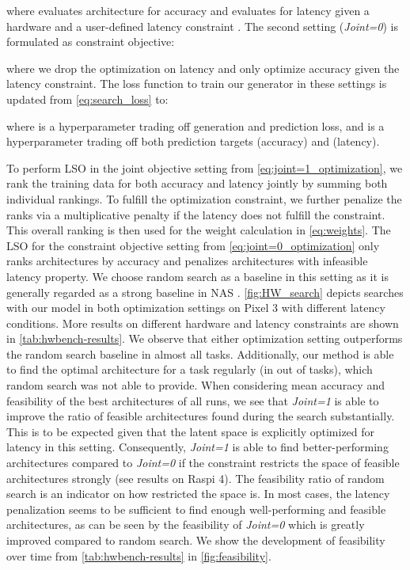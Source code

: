 \documentclass[runningheads]{llncs}
\begin{document}
where  evaluates architecture  for accuracy and  evaluates for latency given a hardware  and a user-defined latency constraint .
The second setting (\emph{Joint=0}) is formulated as constraint objective:


where we drop the optimization on latency and only optimize accuracy given the latency constraint.
The loss function to train our generator in these settings is updated from \autoref{eq:search_loss} to:

where  is a hyperparameter trading off generation and prediction loss, and  is a hyperparameter trading off both prediction targets  (accuracy) and  (latency).

To perform LSO in the joint objective setting from \autoref{eq:joint=1_optimization}, we rank the training data  for both accuracy and latency jointly by summing both individual rankings.
To fulfill the optimization constraint, we further penalize the ranks via a multiplicative penalty if the latency does not fulfill the constraint.
This overall ranking is then used for the weight calculation in \autoref{eq:weights}.
The LSO for the constraint objective setting from \autoref{eq:joint=0_optimization} only ranks architectures by accuracy and penalizes architectures with infeasible latency property.
We choose random search as a baseline in this setting as it is generally regarded as a strong baseline in NAS \cite{2019RS}.
\autoref{fig:HW_search} depicts searches with our model in both optimization settings on Pixel 3 with different latency conditions.
More results on different hardware and latency constraints are shown in \autoref{tab:hwbench-results}.
We observe that either optimization setting outperforms the random search baseline in almost all tasks.
Additionally, our method is able to find the optimal architecture for a task regularly (in  out of  tasks), which random search was not able to provide.
When considering mean accuracy and feasibility of the best architectures of all runs, we see that \emph{Joint=1} is able to improve the ratio of feasible architectures found during the search substantially.
This is to be expected given that the latent space is explicitly optimized for latency in this setting.
Consequently, \emph{Joint=1} is able to find better-performing architectures compared to \emph{Joint=0} if the constraint restricts the space of feasible architectures strongly (see results on Raspi 4).
The feasibility ratio of random search is an indicator on how restricted the space is.
In most cases, the latency penalization seems to be sufficient to find enough well-performing and feasible architectures, as can be seen by the feasibility of \emph{Joint=0} which is greatly improved compared to random search.
We show the development of feasibility over time from \autoref{tab:hwbench-results} in \autoref{fig:feasibility}.
\end{document}
